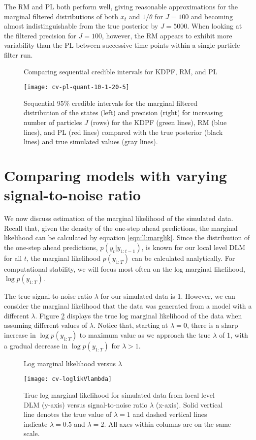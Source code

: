 The RM and PL both perform well, giving reasonable approximations for the marginal filtered distributions of both $x_t$ and $1/\theta$ for $J = 100$ and becoming almost indistinguishable from the true posterior by $J = 5000$. When looking at the filtered precision for $J = 100$, however, the RM appears to exhibit more variability than the PL between successive time points within a single particle filter run.

\begin{figure}[ht]
\ssp
\centering
\caption{Comparing sequential credible intervals for KDPF, RM, and PL} \label{fig:comp:quant}
\texttt{[image: cv-pl-quant-10-1-20-5]}
\caption*{Sequential 95\% credible intervals for the marginal filtered distribution of the states (left) and precision (right) for increasing number of particles $J$ (rows) for the KDPF (green lines), RM (blue lines), and PL (red lines) compared with the true posterior (black lines) and true simulated values (gray lines).}
\end{figure}

\section{Comparing models with varying signal-to-noise ratio} \label{sec:comp:models}

We now discuss estimation of the marginal likelihood of the simulated data. Recall that, given the density of the one-step ahead predictions, the marginal likelihood can be calculated by equation \eqref{eqn:ll:marglik}. Since the distribution of the one-step ahead predictions, $p(y_t|y_{1:t-1})$, is known for our local level DLM for all $t$, the marginal likelihood $p(y_{1:T})$ can be calculated analytically. For computational stability, we will focus most often on the log marginal likelihood, $\log p(y_{1:T})$.

The true signal-to-noise ratio $\lambda$ for our simulated data is 1. However, we can consider the marginal likelihood that the data was generated from a model with a different $\lambda$. Figure \ref{fig:comp:lambda} displays the true log marginal likelihood of the data when assuming different values of $\lambda$. Notice that, starting at $\lambda = 0$, there is a sharp increase in $\log p(y_{1:T})$ to maximum value as we approach the true $\lambda$ of 1, with a gradual decrease in $\log p(y_{1:T})$ for $\lambda > 1$.

\begin{figure}[ht]
\ssp
\centering
\caption{Log marginal likelihood versus $\lambda$} \label{fig:comp:lambda}
\texttt{[image: cv-loglikVlambda]}
\caption*{True log marginal likelihood for simulated data from local level DLM (y-axis) versus signal-to-noise ratio $\lambda$ (x-axis). Solid vertical line denotes the true value of $\lambda = 1$ and dashed vertical lines indicate $\lambda = 0.5$ and $\lambda = 2$. All axes within columns are on the same scale.}
\end{figure}

